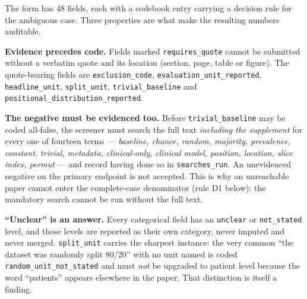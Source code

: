\documentclass[11pt,a4paper]{article}
\begin{document}
The form has 48 fields, each with a codebook entry carrying a decision rule for the
ambiguous case. Three properties are what make the resulting numbers auditable.

\textbf{Evidence precedes code.} Fields marked \texttt{requires\_quote} cannot be
submitted without a verbatim quote and its location (section, page, table or figure).
The quote-bearing fields are \texttt{exclusion\_code},
\texttt{evaluation\_unit\_reported}, \texttt{headline\_unit}, \texttt{split\_unit},
\texttt{trivial\_baseline} and \texttt{positional\_distribution\_reported}.

\textbf{The negative must be evidenced too.} Before \texttt{trivial\_baseline} may be
coded all-false, the screener must search the full text \emph{including the
supplement} for every one of fourteen terms --- \emph{baseline, chance, random,
majority, prevalence, constant, trivial, metadata, clinical-only, clinical model,
position, location, slice index, permut} --- and record having done so in
\texttt{searches\_run}. An unevidenced negative on the primary endpoint is not
accepted. This is why an unreachable paper cannot enter the complete-case denominator
(rule D1 below): the mandatory search cannot be run without the full text.

\textbf{``Unclear'' is an answer.} Every categorical field has an \texttt{unclear} or
\texttt{not\_stated} level, and those levels are reported as their own category,
never imputed and never merged. \texttt{split\_unit} carries the sharpest instance:
the very common ``the dataset was randomly split 80/20'' with no unit named is coded
\texttt{random\_unit\_not\_stated} and must \emph{not} be upgraded to patient level
because the word ``patients'' appears elsewhere in the paper. That distinction is
itself a finding.
\end{document}
